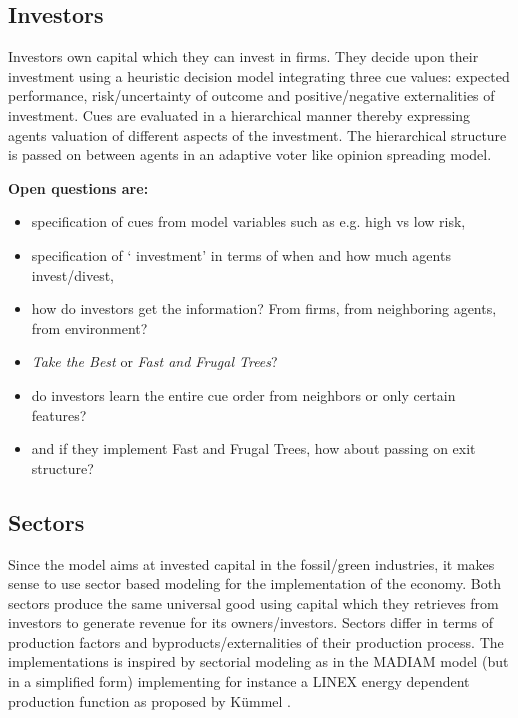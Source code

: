 \subsection{Investors}
Investors own capital which they can invest in firms. They decide upon their investment using a heuristic decision model integrating three cue values: expected performance, risk/uncertainty of outcome and positive/negative externalities of investment. Cues are evaluated in a hierarchical manner thereby expressing agents valuation of different aspects of the investment.
The hierarchical structure is passed on between agents in an adaptive voter like opinion spreading model. \par

\textbf{Open questions are:}
\begin{itemize}
	\item specification of cues from model variables such as e.g. high vs low risk,
	\item specification of ` investment' in terms of when and how much agents invest/divest,
	\item how do investors get the information? From firms, from neighboring agents, from environment?
	\item \textit{Take the Best} or \textit{Fast and Frugal Trees}?
	\item do investors learn the entire cue order from neighbors or only certain features?
	\item and if they implement Fast and Frugal Trees, how about passing on exit structure?
\end{itemize}

\subsection{Sectors}
Since the model aims at invested capital in the fossil/green industries, it makes sense to use sector based modeling for the implementation of the economy. Both sectors produce the same universal good using capital which they retrieves from investors to generate revenue for its owners/investors. Sectors differ in terms of production factors and byproducts/externalities of their production process. The implementations is inspired by sectorial modeling as in the MADIAM model \cite{Weber2005} (but in a simplified form) implementing for instance a LINEX energy dependent production function as proposed by K\"{u}mmel \cite{Kummel1985}. \\

